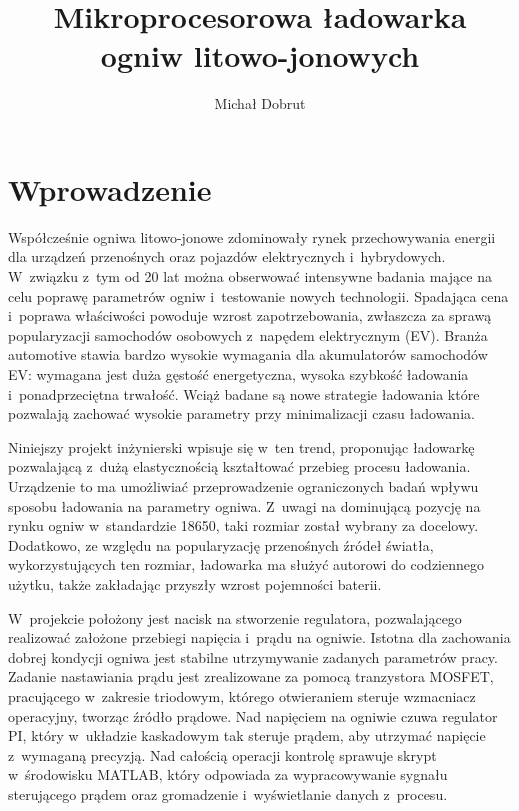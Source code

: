 \documentclass[polish,engineer]{polsl-msth}
\author{Michał Dobrut}
\title{Mikroprocesorowa ładowarka ogniw litowo-jonowych}
\begin{document}
\frontmatter
\maketitle
\makestatement
\tableofcontents
\listoftables
\listoffigures
\mainmatter


\chapter{Wprowadzenie}

Współcześnie ogniwa litowo-jonowe zdominowały rynek przechowywania energii dla urządzeń przenośnych oraz pojazdów elektrycznych i~hybrydowych. W~związku z~tym od 20 lat można obserwować intensywne badania mające na celu poprawę parametrów ogniw i~testowanie nowych technologii. Spadająca cena i~poprawa właściwości powoduje wzrost zapotrzebowania, zwłaszcza za sprawą popularyzacji samochodów osobowych z~napędem elektrycznym (EV). Branża automotive stawia bardzo wysokie wymagania dla akumulatorów samochodów EV: wymagana jest duża gęstość energetyczna, wysoka szybkość ładowania i~ponadprzeciętna trwałość. Wciąż badane są nowe strategie ładowania które pozwalają zachować wysokie parametry przy minimalizacji czasu ładowania.

Niniejszy projekt inżynierski wpisuje się w~ten trend, proponując ładowarkę pozwalającą z~dużą elastycznością kształtować przebieg procesu ładowania. Urządzenie to ma umożliwiać przeprowadzenie ograniczonych badań wpływu sposobu ładowania na parametry ogniwa. Z~uwagi na dominującą pozycję na rynku ogniw w~standardzie 18650, taki rozmiar został wybrany za docelowy. Dodatkowo, ze względu na popularyzację przenośnych źródeł światła, wykorzystujących ten rozmiar, ładowarka ma służyć autorowi do codziennego użytku, także zakładając przyszły wzrost pojemności baterii.

W~projekcie położony jest nacisk na stworzenie regulatora, pozwalającego realizować założone przebiegi napięcia i~prądu na ogniwie. Istotna dla zachowania dobrej kondycji ogniwa jest stabilne utrzymywanie zadanych parametrów pracy. Zadanie nastawiania prądu jest zrealizowane za pomocą tranzystora MOSFET, pracującego w~zakresie triodowym, którego otwieraniem steruje wzmacniacz operacyjny, tworząc źródło prądowe. Nad napięciem na ogniwie czuwa regulator PI, który w~układzie kaskadowym tak steruje prądem, aby utrzymać napięcie z~wymaganą precyzją. Nad całością operacji kontrolę sprawuje skrypt w~środowisku MATLAB, który odpowiada za wypracowywanie sygnału sterującego prądem oraz gromadzenie i~wyświetlanie danych z~procesu.
\end{document}
